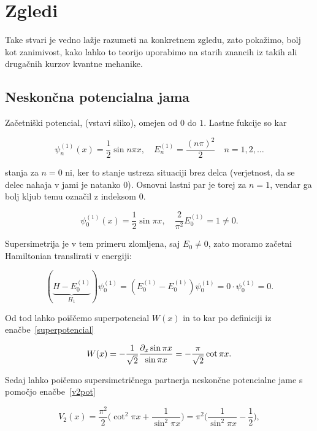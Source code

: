 \section{Zgledi}

Take stvari je vedno la\v zje razumeti na konkretnem zgledu, zato poka\v zimo, bolj kot zanimivost,
kako lahko to teorijo uporabimo na starih znancih iz takih ali druga\v cnih kurzov kvantne mehanike.

\subsection{Neskon\v cna potencialna jama}

Za\v cetni\v ski potencial, (vstavi sliko), omejen od $0$ do $1$. Lastne fukcije so kar

\begin{equation}
	\psi_n^{(1)} (x) = \frac{1}{2}\sin n\pi x, \quad E_n^{(1)} = \frac{(n\pi)^2}{2}
		\quad n = 1,2,\ldots
\end{equation}

stanja za $n = 0$ ni, ker to stanje ustreza situaciji brez delca (verjetnost, da se delec nahaja v jami
je natanko 0). Osnovni lastni par je torej za $n = 1$, vendar ga bolj kljub temu ozna\v cil z indeksom 0.

\begin{equation}
	\psi_0^{(1)} (x) = \frac{1}{2}\sin\pi x, \quad \frac{2}{\pi^2}E_0^{(1)} = 1 \neq 0.
\end{equation}

Supersimetrija je v tem primeru zlomljena, saj $E_0 \neq 0$, zato moramo za\v cetni Hamiltonian
translirati v energiji:

\begin{equation}
	(\underbrace{H - E_0^{(1)}}_{H_1})\psi_0^{(1)} = (E_0^{(1)} - E_0^{(1)})\psi_0^{(1)} =
		0\cdot\psi_0^{(1)} = 0. \label{translacija}
\end{equation}

Od tod lahko poi\v s\v cemo superpotencial $W(x)$ in to kar po definiciji iz
ena\v cbe~\eqref{superpotencial}

\begin{equation}
	W(x) = -\frac{1}{\sqrt{2}} \frac{\partial_x \sin \pi x}{\sin \pi x} = -\frac{\pi}{\sqrt{2}}\cot \pi x.
\end{equation}

Sedaj lahko poi\v cemo supersimetri\v cnega partnerja neskon\v cne potencialne jame s pomo\v cjo
ena\v cbe~\eqref{v2pot}

\begin{equation}
	V_2 (x) = \frac{\pi^2}{2}\bigg(\cot^2 \pi x + \frac{1}{\sin^2 \pi x}\bigg)
		= \pi^2\bigg(\frac{1}{\sin^2 \pi x} - \frac{1}{2}\bigg),
\end{equation}

